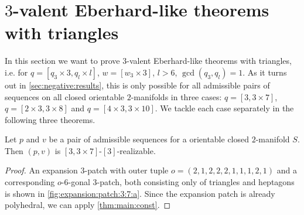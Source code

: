 \checkoddpage
\ifoddpage\else\hbox{}\clearpage\fi
{\par\vspace*{\fill}}
\section{$3$-valent {\sc Eberhard}-like theorems with triangles}\label{sec:3:3}

In this section we want to prove $3$-valent {\sc Eberhard}-like theorems with triangles, i.e. for $q = [q_3 \times 3, q_l \times l]$, $w = [w_3 \times 3]$, $l > 6$, $\gcd(q_3, q_l) = 1$. As it turns out in \autoref{sec:negative:results}, this is only possible for all admissible pairs of sequences on all closed orientable $2$-manifolds in three cases: $q = [3, 3 \times 7]$, $q = [2 \times 3, 3 \times 8]$ and $q = [4 \times 3, 3 \times 10]$. We tackle each case separately in the following three theorems.
\clearpage
\begin{theorem}
  Let $p$ and $v$ be a pair of admissible sequences for a orientable closed $2$-manifold $S$. Then $(p, v)$ is $[3, 3 \times 7]$-$[3]$-realizable.
  \begin{proof}
    An expansion $3$-patch with outer tuple $o = (2, 1, 2, 2, 2, 1, 1, 1, 2, 1)$ and a corresponding $o$-$6$-gonal $3$-patch, both consisting only of triangles and heptagons is shown in \autoref{fig:expansion:patch:3:7:a}. Since the expansion patch is already polyhedral, we can apply \autoref{thm:main:const}.
  \end{proof}
\end{theorem}
{\par\vspace*{\fill}}
